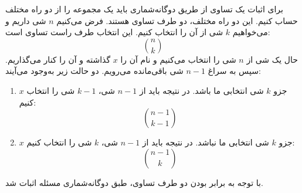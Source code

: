         \p
برای اثبات یک تساوی از طریق دوگانه‌شماری باید یک مجموعه را از دو راه مختلف حساب کنیم. این دو راه مختلف، دو طرف تساوی هستند. فرض می‌کنیم
$n$
شی داریم و می‌خواهیم
$k$
شی از آن را انتخاب کنیم. این انتخاب طرف راست تساوی است:
$$\binom n k$$
حال یک شی از
$n$
شی را انتخاب می‌کنیم و نام آن را
$x$
گذاشته و آن را کنار می‌گذاریم. سپس به سراغ
$n-1$
شی باقی‌مانده می‌رویم. دو حالت زیر به‌وجود می‌آیند:
\begin{enumerate}
\item
$x$
جزو
$k$
شی انتخابی ما باشد. در نتیجه باید از
$n-1$
شی،
$k-1$
شی را انتخاب کنیم:
$$\binom{n-1}{k-1}$$
\item
$x$
جزو
$k$
شی انتخابی ما نباشد. در نتیجه باید از
$n-1$
شی،
$k$
شی را انتخاب کنیم:
$$\binom{n-1}{k}$$
\end{enumerate}
با توجه به برابر بودن دو طرف تساوی، طبق دوگانه‌شماری مسئله اثبات شد.